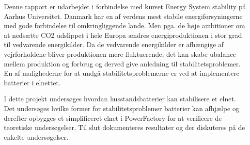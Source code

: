 
\label{Indledning}

Denne rapport er udarbejdet i forbindelse med kurset Energy System stability på Aarhus Universitet. 
Danmark har en af verdens mest stabile energiforsyningerne med gode forbindelse til omkringliggende lande. Men pga. de høje ambitioner om at nedsætte CO2 udslippet i hele Europa ændres energiproduktionen i stor grad til vedvarende energikilder. Da de vedvarende energikilder er afhængige af vejrforholdene bliver produktionen mere fluktuerende, det kan skabe ubalance mellem produktion og forbrug og derved give anledning til stabilitetsproblemer. En af mulighederne for at undgå stabilitetsproblemerne er ved at implementere batterier i elnettet.

I dette projekt undersøges hvordan husstandsbatterier kan stabilisere et elnet. Det undersøges hvilke former for stabilitetsproblemer batterier kan afhjælpe og derefter opbygges et simplificeret elnet i PowerFactory for at verificere de teoretiske undersøgelser. Til slut dokumenteres resultater og der diskuteres på de enkelte undersøgelser.

